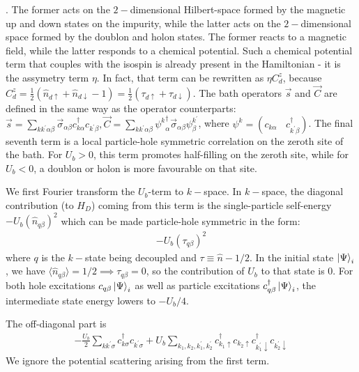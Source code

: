 \cite{anderson1958random,nambu_1960}. The former acts on the \(2-\)dimensional Hilbert-space formed by the magnetic up and down states on the impurity, while the latter acts on the \(2-\)dimensional space formed by the doublon and holon states. The former reacts to a magnetic field, while the latter responds to a chemical potential. Such a chemical potential term that couples with the isospin is already present in the Hamiltonian - it is the assymetry term \(\eta\). In fact, that term can be rewritten as \(\eta C_d^z\), because \(C^z_d = \frac{1}{2}\left(\hat n_{d \uparrow} + \hat n_{d \downarrow} - 1\right) = \frac{1}{2}\left( \tau_{d \uparrow} + \tau_{d \downarrow} \right) \). The bath operators \(\vec s\) and \(\vec C\) are defined in the same way as the operator counterparts: \(\vec s = \sum_{kk^\prime\alpha\beta}\vec \sigma_{\alpha\beta}c^\dagger_{k\alpha}c_{k^\prime\beta}, \vec C = \sum_{kk^\prime\alpha\beta}{\psi^k}^\dagger_\alpha\vec\sigma_{\alpha\beta}\psi^{k^\prime}_\beta\), where \(\psi^k = \left(c_{k\alpha} ~ ~ ~ ~ c^\dagger_{k^\prime\beta}\right) \). The final seventh term is a local particle-hole symmetric correlation on the zeroth site of the bath. For \(U_b>0\), this term promotes half-filling on the zeroth site, while for \(U_b<0\), a doublon or holon is more favourable on that site.

We first Fourier transform the \(U_b\)-term to \(k-\)space. In \(k-\)space, the diagonal contribution (to \(H_D\)) coming from this term is the single-particle self-energy \(-U_b\left(\hat n_{q \beta}\right)^2\) which can be made particle-hole symmetric in the form:
\begin{equation}\begin{aligned}
	-U_b\left(\tau_{q \beta}\right)^2
\end{aligned}\end{equation}
where \(q\) is the \(k-\)state being decoupled and \(\tau \equiv \hat n - 1/2\). In the initial state \(\ket{\Psi}_i\), we have \(\langle \hat n_{q\beta} \rangle = 1/2 \implies \tau_{q\beta} = 0\), so the contribution of \(U_b\) to that state is 0. For both hole excitations \(c_{q\beta}\ket{\Psi}_i\) as well as particle excitations \(c^\dagger_{q\beta}\ket{\Psi}_i\), the intermediate state energy lowers to \(-U_b/4\).

The off-diagonal part is
\begin{equation}\begin{aligned}
	-\frac{U_b}{2}\sum_{kk^\prime\sigma}c^\dagger_{k\sigma}c_{k^\prime\sigma} + U_b \sum_{k_1,k_2,k_1^\prime,k_2^\prime} c^\dagger_{k_1 \uparrow}c_{k_2 \uparrow} c^\dagger_{k^\prime_1 \downarrow}c_{k^\prime_2 \downarrow} 
\end{aligned}\end{equation}
We ignore the potential scattering arising from the first term.


